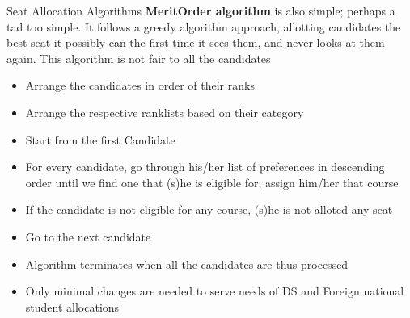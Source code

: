 \documentclass{beamer}
\begin{document}
\begin{frame}[t]{Seat Allocation Algorithms}
\pause
\textbf{MeritOrder algorithm} is also simple; perhaps a tad too simple. It follows a greedy algorithm approach, allotting candidates the best seat it possibly can the first time it sees them, and never looks at them again.
This algorithm is not fair to all the candidates
 \pause
\begin{itemize}
\item Arrange the candidates in order of their ranks
 \pause
\item Arrange the respective ranklists based on their category
 \pause
\item Start from the first Candidate
 \pause
\item For every candidate, go through his/her list of preferences in descending order until we find one that (s)he is eligible for; assign him/her that course
 \pause
\item If the candidate is not eligible for any course, (s)he is not alloted any seat
 \pause
\item Go to the next candidate
 \pause
\item Algorithm terminates when all the candidates are thus processed
 \pause
\item Only minimal changes are needed to serve needs of DS and Foreign national student allocations
\end{itemize}
\end{frame}
\end{document}
